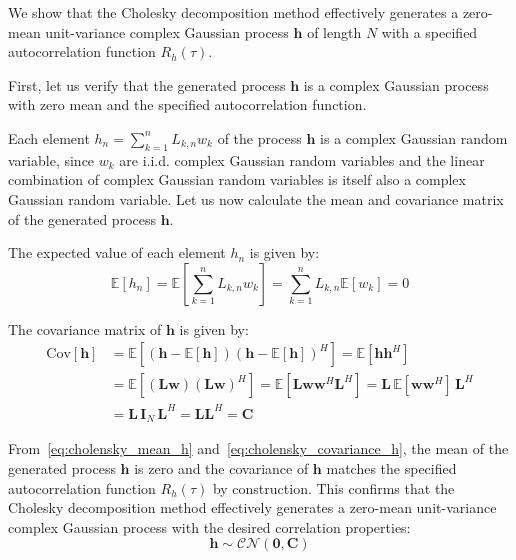 We show that the Cholesky decomposition method effectively generates a zero-mean unit-variance complex Gaussian process $\mathbf{h}$ of length $N$ with a specified autocorrelation function $R_h(\tau)$.

First, let us verify that the generated process $\mathbf{h}$ is a complex Gaussian process with zero mean and the specified autocorrelation function.

Each element $h_n = \sum_{k=1}^n L_{k, n} w_k$ of the process $\mathbf{h}$ is a complex Gaussian random variable, since $w_k$ are \ac{i.i.d.} complex Gaussian random variables and the linear combination of complex Gaussian random variables is itself also a complex Gaussian random variable. Let us now calculate the mean and covariance matrix of the generated process $\mathbf{h}$.

The expected value of each element $h_n$ is given by:
\begin{equation}
\label{eq:cholensky_mean_h}
    \mathbb{E}[h_n] = \mathbb{E}\left[\sum_{k=1}^n L_{k, n} w_k\right] = \sum_{k=1}^n L_{k, n} \mathbb{E}[w_k] = 0
\end{equation}

The covariance matrix of $\mathbf{h}$ is given by:
\begin{equation}
\label{eq:cholensky_covariance_h}
\begin{aligned}
    \text{Cov}[\mathbf{h}] &= \mathbb{E}[(\mathbf{h} - \mathbb{E}[\mathbf{h}])(\mathbf{h} - \mathbb{E}[\mathbf{h}])^H] = \mathbb{E}[\mathbf{h}\mathbf{h}^H] \\
    &= \mathbb{E}[(\mathbf{L}\mathbf{w})(\mathbf{L}\mathbf{w})^H] = \mathbb{E}[\mathbf{L}\mathbf{w}\mathbf{w}^H\mathbf{L}^H] = \mathbf{L} \,  \mathbb{E}[\mathbf{w}\mathbf{w}^H] \, \mathbf{L}^H \\
    &= \mathbf{L} \, \mathbf{I}_N \, \mathbf{L}^H = \mathbf{L} \mathbf{L}^H = \mathbf{C}
\end{aligned}
\end{equation}

From~\eqref{eq:cholensky_mean_h} and~\eqref{eq:cholensky_covariance_h}, the mean of the generated process $\mathbf{h}$ is zero and the covariance of $\mathbf{h}$ matches the specified autocorrelation function $R_h(\tau)$ by construction. This confirms that the Cholesky decomposition method effectively generates a zero-mean unit-variance complex Gaussian process with the desired correlation properties:
\begin{equation}
    \mathbf{h} \sim \mathcal{CN}(\mathbf{0}, \mathbf{C})
\end{equation}


